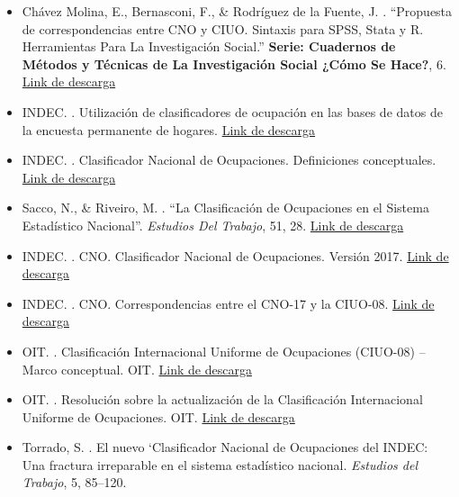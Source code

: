\documentclass[
]{book}
\begin{document}
\begin{itemize}
\item
  Chávez Molina, E., Bernasconi, F., \& Rodríguez de la Fuente, J. \citeyearpar{ChavezMolina.etal2020}. ``Propuesta de correspondencias entre CNO y CIUO. Sintaxis para SPSS, Stata y R. Herramientas Para La Investigación Social.'' \textbf{Serie: Cuadernos de Métodos y Técnicas de La Investigación Social ¿Cómo Se Hace?}, 6. \href{http://iigg.sociales.uba.ar/2020/09/30/his-6-propuesta-de-correspondencias-entre-cno-y-ciuo-sintaxis-para-spss-stata-y-r/?fbclid=IwAR3RvLDs7H8wYHDqUooZMEI74HIDS6MXT3YbEjstG44yt0DB9tFj0VwlT9A}{Link de descarga}
\item
  INDEC. \citeyearpar{INDEC2000a}. Utilización de clasificadores de ocupación en las bases de datos de la encuesta permanente de hogares. \href{https://www.indec.gob.ar/dbindec/EPH_Clasif_Ocup_hasta_CNO_2001.doc}{Link de descarga}
\item
  INDEC. \citeyearpar{INDEC2018}. Clasificador Nacional de Ocupaciones. Definiciones conceptuales. \href{https://www.indec.gob.ar/ftp/cuadros/menusuperior/clasificadores/definiciones_conceptuales_cno.pdf}{Link de descarga}
\item
  Sacco, N., \& Riveiro, M. \citeyearpar{Sacco2016b}. ``La Clasificación de Ocupaciones en el Sistema Estadístico Nacional''. \emph{Estudios Del Trabajo}, 51, 28. \href{https://aset.org.ar/ojs/revista/article/view/24}{Link de descarga}
\item
  INDEC. \citeyearpar{INDEC2018a}. CNO. Clasificador Nacional de Ocupaciones. Versión 2017. \href{https://www.indec.gob.ar/ftp/cuadros/menusuperior/clasificadores/CNO_2017.pdf}{Link de descarga}
\item
  INDEC. \citeyearpar{INDEC2018b}. CNO. Correspondencias entre el CNO-17 y la CIUO-08. \href{https://www.indec.gob.ar/ftp/cuadros/menusuperior/clasificadores/correspondencias_cno2017_ciuo2008.pdf}{Link de descarga}
\item
  OIT. \citeyearpar{OIT2008}. Clasificación Internacional Uniforme de Ocupaciones (CIUO-08) -- Marco conceptual. OIT. \href{https://www.ilo.org/public/spanish/bureau/stat/isco/docs/annex1.pdf}{Link de descarga}
\item
  OIT. \citeyearpar{OIT2008a}. Resolución sobre la actualización de la Clasificación Internacional Uniforme
  de Ocupaciones. OIT. \href{https://www.ilo.org/public/spanish/bureau/stat/isco/docs/resol08.pdf}{Link de descarga}
\item
  Torrado, S. \citeyearpar{Torrado1993a}. El nuevo `Clasificador Nacional de Ocupaciones del INDEC: Una fractura irreparable en el sistema estadístico nacional. \emph{Estudios del Trabajo}, 5, 85--120.
\end{itemize}
\end{document}
